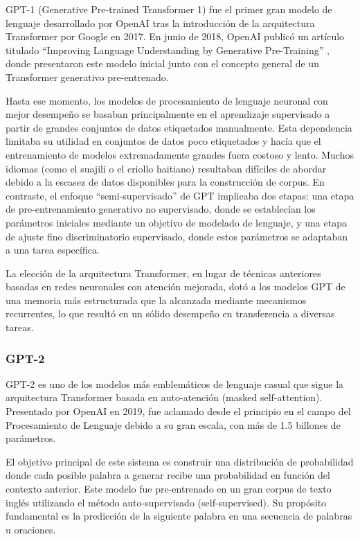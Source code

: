 GPT-1 (Generative Pre-trained Transformer 1) fue el primer gran modelo de lenguaje desarrollado por OpenAI tras la introducción de la arquitectura Transformer por Google en 2017. En junio de 2018, OpenAI publicó un artículo titulado ``Improving Language Understanding by Generative Pre-Training'' \citep{radford2018improving}, donde presentaron este modelo inicial junto con el concepto general de un Transformer generativo pre-entrenado.

Hasta ese momento, los modelos de procesamiento de lenguaje neuronal con mejor desempeño se basaban principalmente en el aprendizaje supervisado a partir de grandes conjuntos de datos etiquetados manualmente. Esta dependencia limitaba su utilidad en conjuntos de datos poco etiquetados y hacía que el entrenamiento de modelos extremadamente grandes fuera costoso y lento. Muchos idiomas (como el suajili o el criollo haitiano) resultaban difíciles de abordar debido a la escasez de datos disponibles para la construcción de corpus. En contraste, el enfoque ``semi-supervisado'' de GPT implicaba dos etapas: una etapa de pre-entrenamiento generativo no supervisado, donde se establecían los parámetros iniciales mediante un objetivo de modelado de lenguaje, y una etapa de ajuste fino discriminatorio supervisado, donde estos parámetros se adaptaban a una tarea específica.

La elección de la arquitectura Transformer, en lugar de técnicas anteriores basadas en redes neuronales con atención mejorada, dotó a los modelos GPT de una memoria más estructurada que la alcanzada mediante mecanismos recurrentes, lo que resultó en un sólido desempeño en transferencia a diversas tareas.

\subsubsection{GPT-2}

GPT-2 es uno de los modelos más emblemáticos de lenguaje casual que sigue la arquitectura Transformer basada en auto-atención (masked self-attention). Presentado por OpenAI en 2019, fue aclamado desde el principio en el campo del Procesamiento de Lenguaje debido a su gran escala, con más de 1.5 billones de parámetros.

El objetivo principal de este sistema es construir una distribución de probabilidad donde cada posible palabra a generar recibe una probabilidad en función del contexto anterior. Este modelo fue pre-entrenado en un gran corpus de texto inglés utilizando el método auto-supervisado (self-supervised). Su propósito fundamental es la predicción de la siguiente palabra en una secuencia de palabras u oraciones.

